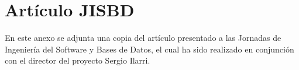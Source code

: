 \chapter{Artículo JISBD}

En este anexo se adjunta una copia del artículo presentado a las Jornadas de Ingeniería del Software y Bases de Datos, el cual ha sido realizado en conjunción con el director del proyecto Sergio Ilarri.

%